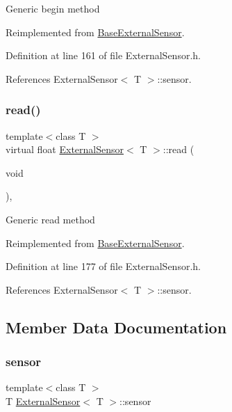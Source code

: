 Generic begin method 

Reimplemented from \hyperlink{class_base_external_sensor_a87d132803d4f4fdd4e66332809f0c9a0}{Base\+External\+Sensor}.



Definition at line 161 of file External\+Sensor.\+h.



References External\+Sensor$<$ T $>$\+::sensor.

\mbox{\label{class_external_sensor_a5fb3afc7d244fb86dac68ab5481bc407}} 
\subsubsection{\texorpdfstring{read()}{read()}}
{\footnotesize\ttfamily template$<$class T $>$ \\
virtual float \hyperlink{class_external_sensor}{External\+Sensor}$<$ T $>$\+::read (\begin{DoxyParamCaption}\item[{void}]{ }\end{DoxyParamCaption})\hspace{0.3cm}{\ttfamily [inline]}, {\ttfamily [virtual]}}

Generic read method 

Reimplemented from \hyperlink{class_base_external_sensor_a1564f16deacf57b51b9948ac29db4291}{Base\+External\+Sensor}.



Definition at line 177 of file External\+Sensor.\+h.



References External\+Sensor$<$ T $>$\+::sensor.



\subsection{Member Data Documentation}
\mbox{\label{class_external_sensor_a6e1f518119abe08c14b498ce24a7e1b3}} 
\subsubsection{\texorpdfstring{sensor}{sensor}}
{\footnotesize\ttfamily template$<$class T $>$ \\
T \hyperlink{class_external_sensor}{External\+Sensor}$<$ T $>$\+::sensor\hspace{0.3cm}{\ttfamily [private]}}



